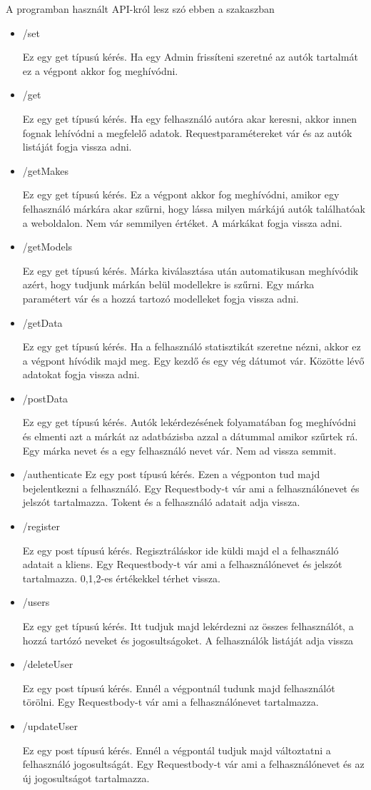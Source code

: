  
A programban használt API-król lesz szó ebben a szakaszban
\begin{itemize}
\item /set

Ez egy get típusú kérés. Ha egy Admin frissíteni szeretné az autók tartalmát ez a végpont akkor fog meghívódni.
\item /get

Ez egy get típusú kérés. Ha egy felhasználó autóra akar keresni, akkor innen fognak lehívódni a megfelelő adatok.
Requestparamétereket vár és az autók listáját fogja vissza adni.
\item /getMakes

Ez egy get típusú kérés. Ez a végpont akkor fog meghívódni, amikor egy felhasználó márkára akar szűrni, hogy lássa milyen márkájú autók találhatóak a weboldalon.
Nem vár semmilyen értéket. A márkákat fogja vissza adni.
\item /getModels

Ez egy get típusú kérés. Márka kiválasztása után automatikusan meghívódik azért, hogy tudjunk márkán belül modellekre is szűrni.
Egy márka paramétert vár és a hozzá tartozó modelleket fogja vissza adni.
\item /getData

Ez egy get típusú kérés. Ha a felhasználó statisztikát szeretne nézni, akkor ez a végpont hívódik majd meg.
Egy kezdő és egy vég dátumot vár. Közötte lévő adatokat fogja vissza adni.
\item /postData

Ez egy get típusú kérés. Autók lekérdezésének folyamatában fog meghívódni és elmenti azt a márkát az adatbázisba azzal a dátummal amikor szűrtek rá.
Egy márka nevet és a egy felhasználó nevet vár. Nem ad vissza semmit.
\item /authenticate
Ez egy post típusú kérés. Ezen a végponton tud majd bejelentkezni a felhasználó.
Egy Requestbody-t vár ami a felhasználónevet és jelszót tartalmazza. Tokent és a felhasználó adatait adja vissza.
\item /register

Ez egy post típusú kérés. Regisztráláskor ide küldi majd el a felhasználó adatait a kliens.
Egy Requestbody-t vár ami a felhasználónevet és jelszót tartalmazza. 0,1,2-es értékekkel térhet vissza.
\item /users

Ez egy get típusú kérés. Itt tudjuk majd lekérdezni az összes felhasználót, a hozzá tartózó neveket és jogosultságoket.
A felhasználók listáját adja vissza
\item /deleteUser

Ez egy post típusú kérés. Ennél a végpontnál tudunk majd felhasználót törölni.
Egy Requestbody-t vár ami a felhasználónevet tartalmazza.
\item /updateUser

Ez egy post típusú kérés. Ennél  a végpontál tudjuk majd változtatni a felhasználó jogosultságát.
Egy Requestbody-t vár ami a felhasználónevet és az új jogosultságot tartalmazza.

\end{itemize}









